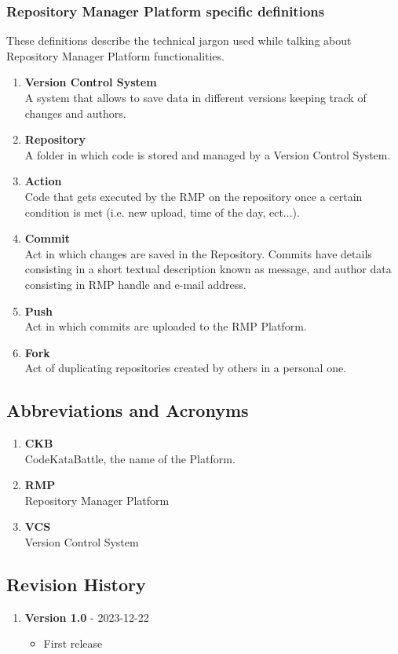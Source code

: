 \subsubsection{Repository Manager Platform specific definitions}
These definitions describe the technical jargon used while talking about Repository Manager Platform functionalities.
\begin{enumerate}[label=$\bullet$]
    \item \textbf{Version Control System}\\A system that allows to save data in different versions keeping track of changes and authors.
    \item \textbf{Repository}\\A folder in which code is stored and managed by a Version Control System.
    \item \textbf{Action}\\Code that gets executed by the RMP on the repository once a certain condition is met (i.e. new upload, time of the day, ect...).
    \item \textbf{Commit}\\Act in which changes are saved in the Repository. Commits have details consisting in a short textual description known as message, and author data consisting in RMP handle and e-mail address.
    \item \textbf{Push}\\Act in which commits are uploaded to the RMP Platform.
    \item \textbf{Fork}\\Act of duplicating repositories created by others in a personal one.
\end{enumerate}
\subsection{Abbreviations and Acronyms}
\begin{enumerate}[label=$\bullet$]
    \item \textbf{CKB}\\CodeKataBattle, the name of the Platform.
    \item \textbf{RMP}\\Repository Manager Platform
    \item \textbf{VCS}\\Version Control System
\end{enumerate}

\subsection{Revision History}
\newcommand{\release}[2]{
    \item \textbf{Version #1} - #2
}
\begin{enumerate}[label=$\bullet$]
    \release{1.0}{2023-12-22}
    \begin{itemize}
        \item First release
    \end{itemize}
\end{enumerate}

